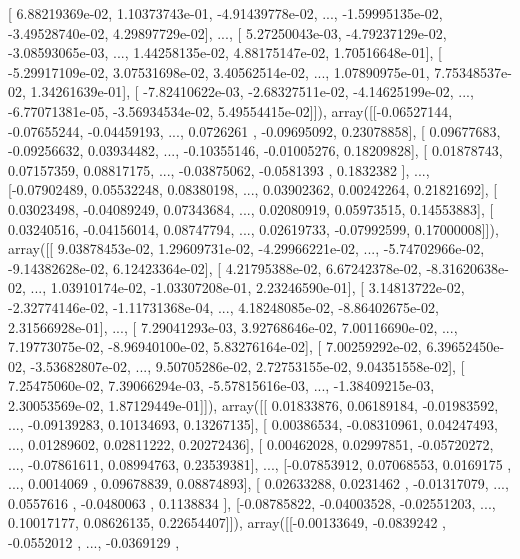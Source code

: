 \documentclass{article}
\begin{document}
       [  6.88219369e-02,   1.10373743e-01,  -4.91439778e-02, ...,
         -1.59995135e-02,  -3.49528740e-02,   4.29897729e-02],
       ..., 
       [  5.27250043e-03,  -4.79237129e-02,  -3.08593065e-03, ...,
          1.44258135e-02,   4.88175147e-02,   1.70516648e-01],
       [ -5.29917109e-02,   3.07531698e-02,   3.40562514e-02, ...,
          1.07890975e-01,   7.75348537e-02,   1.34261639e-01],
       [ -7.82410622e-03,  -2.68327511e-02,  -4.14625199e-02, ...,
         -6.77071381e-05,  -3.56934534e-02,   5.49554415e-02]]), array([[-0.06527144, -0.07655244, -0.04459193, ...,  0.0726261 ,
        -0.09695092,  0.23078858],
       [ 0.09677683, -0.09256632,  0.03934482, ..., -0.10355146,
        -0.01005276,  0.18209828],
       [ 0.01878743,  0.07157359,  0.08817175, ..., -0.03875062,
        -0.0581393 ,  0.1832382 ],
       ..., 
       [-0.07902489,  0.05532248,  0.08380198, ...,  0.03902362,
         0.00242264,  0.21821692],
       [ 0.03023498, -0.04089249,  0.07343684, ...,  0.02080919,
         0.05973515,  0.14553883],
       [ 0.03240516, -0.04156014,  0.08747794, ...,  0.02619733,
        -0.07992599,  0.17000008]]), array([[  9.03878453e-02,   1.29609731e-02,  -4.29966221e-02, ...,
         -5.74702966e-02,  -9.14382628e-02,   6.12423364e-02],
       [  4.21795388e-02,   6.67242378e-02,  -8.31620638e-02, ...,
          1.03910174e-02,  -1.03307208e-01,   2.23246590e-01],
       [  3.14813722e-02,  -2.32774146e-02,  -1.11731368e-04, ...,
          4.18248085e-02,  -8.86402675e-02,   2.31566928e-01],
       ..., 
       [  7.29041293e-03,   3.92768646e-02,   7.00116690e-02, ...,
          7.19773075e-02,  -8.96940100e-02,   5.83276164e-02],
       [  7.00259292e-02,   6.39652450e-02,  -3.53682807e-02, ...,
          9.50705286e-02,   2.72753155e-02,   9.04351558e-02],
       [  7.25475060e-02,   7.39066294e-03,  -5.57815616e-03, ...,
         -1.38409215e-03,   2.30053569e-02,   1.87129449e-01]]), array([[ 0.01833876,  0.06189184, -0.01983592, ..., -0.09139283,
         0.10134693,  0.13267135],
       [ 0.00386534, -0.08310961,  0.04247493, ...,  0.01289602,
         0.02811222,  0.20272436],
       [ 0.00462028,  0.02997851, -0.05720272, ..., -0.07861611,
         0.08994763,  0.23539381],
       ..., 
       [-0.07853912,  0.07068553,  0.0169175 , ...,  0.0014069 ,
         0.09678839,  0.08874893],
       [ 0.02633288,  0.0231462 , -0.01317079, ...,  0.0557616 ,
        -0.0480063 ,  0.1138834 ],
       [-0.08785822, -0.04003528, -0.02551203, ...,  0.10017177,
         0.08626135,  0.22654407]]), array([[-0.00133649, -0.0839242 , -0.0552012 , ..., -0.0369129 ,
\end{document}
